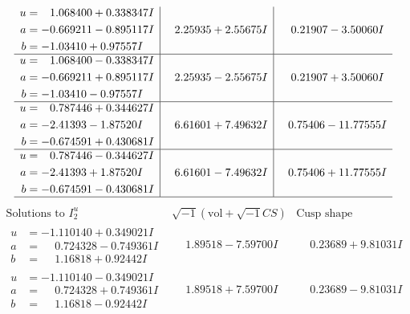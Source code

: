 \documentclass[1p]{elsarticle_modified}
\theoremstyle{definition}
\newcommand{\I}{\sqrt{-1}}
\begin{document}
$$\begin{array}{c|c|c}
\begin{aligned}
u &= \phantom{-}1.068400 + 0.338347 I \\
a &= -0.669211 - 0.895117 I \\
b &= -1.03410 + 0.97557 I\end{aligned}
 & \phantom{-}2.25935 + 2.55675 I & \phantom{-}0.21907 - 3.50060 I \\ \hline\begin{aligned}
u &= \phantom{-}1.068400 - 0.338347 I \\
a &= -0.669211 + 0.895117 I \\
b &= -1.03410 - 0.97557 I\end{aligned}
 & \phantom{-}2.25935 - 2.55675 I & \phantom{-}0.21907 + 3.50060 I \\ \hline\begin{aligned}
u &= \phantom{-}0.787446 + 0.344627 I \\
a &= -2.41393 - 1.87520 I \\
b &= -0.674591 + 0.430681 I\end{aligned}
 & \phantom{-}6.61601 + 7.49632 I & \phantom{-}0.75406 - 11.77555 I \\ \hline\begin{aligned}
u &= \phantom{-}0.787446 - 0.344627 I \\
a &= -2.41393 + 1.87520 I \\
b &= -0.674591 - 0.430681 I\end{aligned}
 & \phantom{-}6.61601 - 7.49632 I & \phantom{-}0.75406 + 11.77555 I\\
 \hline 
 \end{array}$$\newpage$$\begin{array}{c|c|c}  
\text{Solutions to }I^u_{2}& \I (\text{vol} + \sqrt{-1}CS) & \text{Cusp shape}\\
 \hline 
\begin{aligned}
u &= -1.110140 + 0.349021 I \\
a &= \phantom{-}0.724328 - 0.749361 I \\
b &= \phantom{-}1.16818 + 0.92442 I\end{aligned}
 & \phantom{-}1.89518 - 7.59700 I & \phantom{-}0.23689 + 9.81031 I \\ \hline\begin{aligned}
u &= -1.110140 - 0.349021 I \\
a &= \phantom{-}0.724328 + 0.749361 I \\
b &= \phantom{-}1.16818 - 0.92442 I\end{aligned}
 & \phantom{-}1.89518 + 7.59700 I & \phantom{-}0.23689 - 9.81031 I \\ \hline\begin{aligned}

\end{aligned}
\end{array}$$
\end{document}
